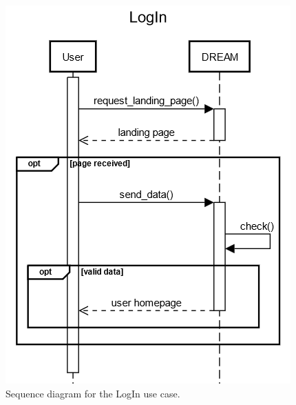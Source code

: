 \documentclass{article}
\begin{document}
\begin{figure}[H]
    \centering
    \includegraphics[scale=0.60]{sequence_diagrams/LogIn.png}
    \caption{Sequence diagram for the LogIn use case.}
\end{figure}

\newpage
\end{document}
